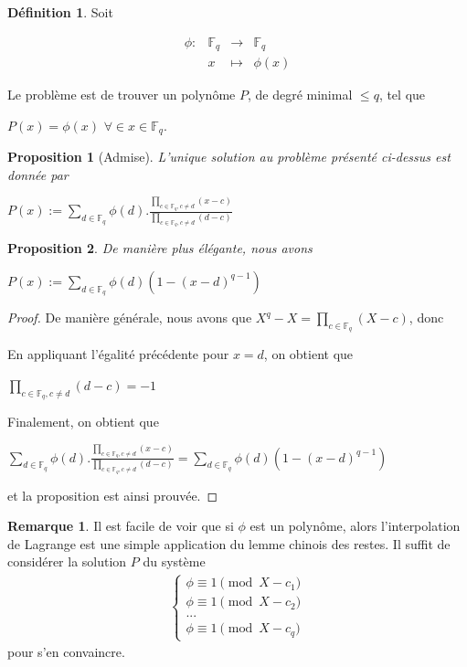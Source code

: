 \documentclass[12pt]{article}
\newcommand{\Fq}{\mathds{F}_q}
\newcommand{\fonction}[5]{
\begin{displaymath}
\begin{array}{l|rcl}
\displaystyle
#1 : & #2 & \longrightarrow & #3 \\
    & #4 & \longmapsto & #5
\end{array}
\end{displaymath}
}
\newtheorem{prop}{Proposition}
\theoremstyle{definition}
\newtheorem{definition}{Définition}
\newtheorem{rem}{Remarque}
\begin{document}
\begin{definition}
Soit
\fonction{\phi}{\Fq}{\Fq}{x}{\phi(x)}
Le problème est de trouver un polynôme $P$, de degré minimal $\le q$, tel que 
	\begin{center} $P(x) = \phi(x)$ $\forall  \in  x \in \Fq$. \end{center}
\end{definition}

\begin{prop}[Admise]
L'unique solution au problème présenté ci-dessus est donnée par 
	\begin{center} $P(x) := \displaystyle\sum_{d \in \Fq} \phi(d).\displaystyle\frac{\displaystyle\prod_{c \in \Fq, c \ne d }(x - c)}{\displaystyle\prod_{c \in \Fq, c \ne d}(d -c)}$\end{center}
\end{prop}

\begin{prop}
De manière plus élégante, nous avons
	\begin{center} $P(x) := \displaystyle \sum_{d \in \Fq } \phi(d) (1 - (x-d)^{q-1}) $ \end{center}
\end{prop}

\begin{proof}De manière générale, nous avons que $X^q - X = \displaystyle\prod_{c \in \Fq} (X-c)$, donc \newline



En appliquant l'égalité précédente pour $x = d$, on obtient que \begin{center} $\displaystyle\prod_{c \in \Fq, c \ne d }(d - c) = -1$ \end{center}
Finalement, on obtient que 
\begin{center} $ \displaystyle\sum_{d \in \Fq} \phi(d).\displaystyle\frac{\displaystyle\prod_{c \in \Fq, c \ne d }(x - c)}{\displaystyle\prod_{c \in \Fq, c \ne d}(d -c)} =  \displaystyle \sum_{d \in \Fq } \phi(d) (1 - (x-d)^{q-1})$  \end{center}
et la proposition est ainsi prouvée.
\end{proof}

\begin{rem}
Il est facile de voir que si $\phi $ est un polynôme, alors l'interpolation de Lagrange est une simple application du lemme chinois des restes. \newline
Il suffit de considérer la solution $P$ du système
	\begin{align*}
		\begin{cases}
			\phi \equiv 1 \pmod{X - c_1} \\
			\phi \equiv 1 \pmod{X - c_2} \\
			... \\
			\phi \equiv 1 \pmod{X - c_q}
  		\end{cases}
	\end{align*}
pour s'en convaincre.
\end{rem}
\end{document}
